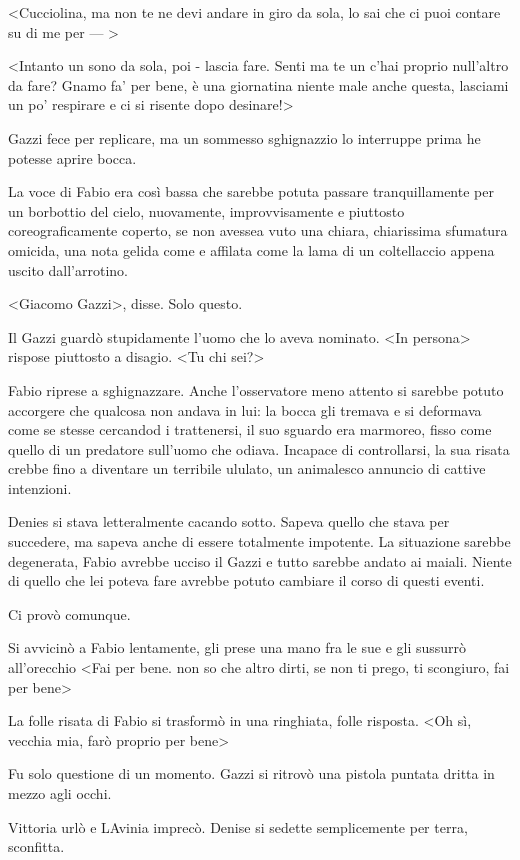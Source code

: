 <Cucciolina, ma non te ne devi andare in giro da sola, lo sai che ci puoi contare su di me per --- >

<Intanto un sono da sola, poi - lascia fare. Senti ma te un c'hai proprio null'altro da fare? Gnamo fa' per bene, è una giornatina niente male anche questa, lasciami un po' respirare e ci si risente dopo desinare!>

Gazzi fece per replicare, ma un sommesso sghignazzio lo interruppe prima he potesse aprire bocca.

La voce di Fabio era così bassa che sarebbe potuta passare tranquillamente per un borbottio del cielo, nuovamente, improvvisamente e piuttosto coreograficamente coperto, se non avessea vuto una chiara, chiarissima sfumatura omicida, una nota gelida come e affilata come la lama di un coltellaccio appena uscito dall'arrotino.

<Giacomo Gazzi>, disse. Solo questo.

Il Gazzi guardò stupidamente l'uomo che lo aveva nominato. <In persona> rispose piuttosto a disagio. <Tu chi sei?>

Fabio riprese a sghignazzare. Anche l'osservatore meno attento si sarebbe potuto accorgere che qualcosa non andava in lui: la bocca gli tremava e si deformava come se stesse cercandod i trattenersi, il suo sguardo era marmoreo, fisso come quello di un predatore sull'uomo che odiava. Incapace di controllarsi, la sua risata crebbe fino a diventare un terribile ululato, un animalesco annuncio di cattive intenzioni.

Denies si stava letteralmente cacando sotto. Sapeva quello che stava per succedere, ma sapeva anche di essere totalmente impotente. La situazione sarebbe degenerata, Fabio avrebbe ucciso il Gazzi e tutto sarebbe andato ai maiali. Niente di quello che lei poteva fare avrebbe potuto cambiare il corso di questi eventi.

Ci provò comunque.

Si avvicinò a Fabio lentamente, gli prese una mano fra le sue e gli sussurrò all'orecchio <Fai per bene. non so che altro dirti, se non ti prego, ti scongiuro, fai per bene>

La folle risata di Fabio si trasformò in una ringhiata, folle risposta. <Oh sì, vecchia mia, farò proprio per bene>

Fu solo questione di un momento. Gazzi si ritrovò una pistola puntata dritta in mezzo agli occhi.

Vittoria urlò e LAvinia imprecò. Denise si sedette semplicemente per terra, sconfitta. 

